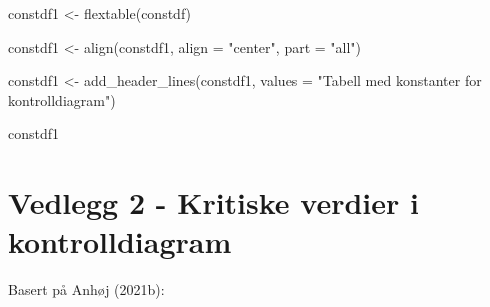 \documentclass[
]{book}
\newenvironment{Shaded}{\begin{snugshade}}{\end{snugshade}}
\newcommand{\AttributeTok}[1]{\textcolor[rgb]{0.77,0.63,0.00}{#1}}
\newcommand{\FunctionTok}[1]{\textcolor[rgb]{0.00,0.00,0.00}{#1}}
\newcommand{\NormalTok}[1]{#1}
\newcommand{\OtherTok}[1]{\textcolor[rgb]{0.56,0.35,0.01}{#1}}
\newcommand{\StringTok}[1]{\textcolor[rgb]{0.31,0.60,0.02}{#1}}
\begin{document}
\begin{Shaded}
\begin{Highlighting}[]
\NormalTok{constdf1 }\OtherTok{\textless{}{-}} \FunctionTok{flextable}\NormalTok{(constdf)}

\NormalTok{constdf1 }\OtherTok{\textless{}{-}} \FunctionTok{align}\NormalTok{(constdf1, }\AttributeTok{align =} \StringTok{"center"}\NormalTok{, }\AttributeTok{part =} \StringTok{"all"}\NormalTok{)}

\NormalTok{constdf1 }\OtherTok{\textless{}{-}} \FunctionTok{add\_header\_lines}\NormalTok{(constdf1, }\AttributeTok{values =} \StringTok{"Tabell med konstanter for kontrolldiagram"}\NormalTok{)}

\NormalTok{constdf1}
\end{Highlighting}
\end{Shaded}

\hypertarget{vedlegg-2---kritiske-verdier-i-kontrolldiagram}{%
\chapter*{Vedlegg 2 - Kritiske verdier i kontrolldiagram}\label{vedlegg-2---kritiske-verdier-i-kontrolldiagram}}

Basert på Anhøj (2021b):
\end{document}
